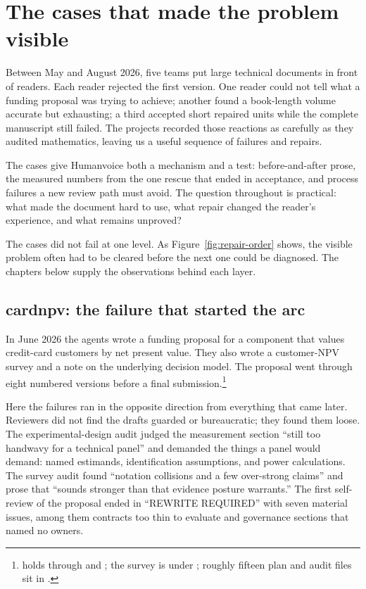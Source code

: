 \chapter{The cases that made the problem visible}
\label{sec:record}

Between May and August 2026, five teams put large technical documents in front
of readers. Each reader rejected the first version. One reader could not tell
what a funding proposal was trying to achieve; another found a book-length
volume accurate but exhausting; a third accepted short repaired units while
the complete manuscript still failed. The projects recorded those reactions as
carefully as they audited mathematics, leaving us a useful sequence of failures
and repairs.

The cases give Humanvoice both a mechanism and a test: before-and-after prose,
the measured numbers from the one rescue that ended in acceptance, and process
failures a new review path must avoid. The question throughout is practical:
what made the document hard to use, what repair changed the reader's
experience, and what remains unproved?

The cases did not fail at one level. As Figure~\ref{fig:repair-order} shows,
the visible problem often had to be cleared before the next one could be
diagnosed. The chapters below supply the observations behind each layer.

\hvFigureFailureLayers

\section{cardnpv: the failure that started the arc}
\label{sec:cardnpv}

In June 2026 the agents wrote a funding proposal for a component that values
credit-card customers by net present value. They also wrote a customer-NPV
survey and a note on the underlying decision model. The proposal went through
eight numbered versions before a final
submission.\footnote{ holds  through  and ; the survey is under ; roughly fifteen plan and audit files sit in .}

Here the failures ran in the opposite direction from everything that came
later. Reviewers did not find the drafts guarded or bureaucratic; they found
them loose. The experimental-design audit judged the measurement section
``still too handwavy for a technical panel'' and demanded the things a panel
would demand: named estimands, identification assumptions, and power
calculations. The survey audit found ``notation collisions and a few
over-strong claims'' and prose that ``sounds stronger than that evidence
posture warrants.'' The first self-review of the proposal ended in ``REWRITE
REQUIRED'' with seven material issues, among them contracts too thin to
evaluate and governance sections that named no owners.

